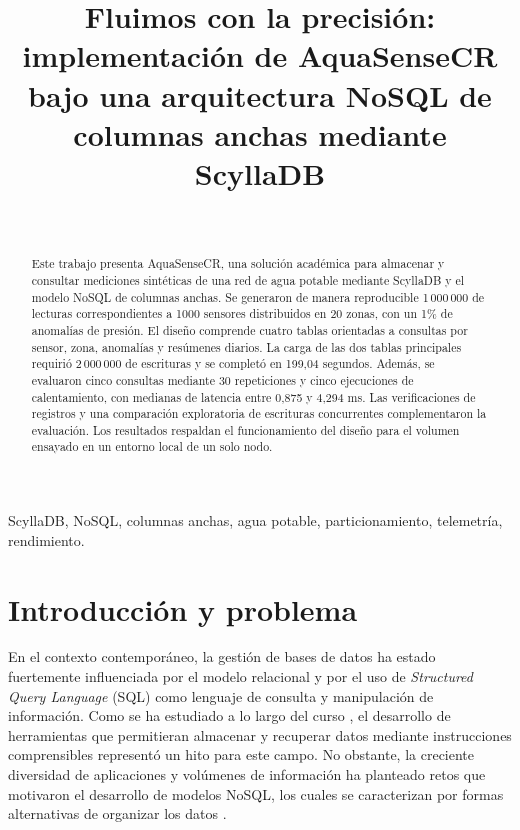 \documentclass[conference]{IEEEtran}
\begin{document}
\title{Fluimos con la precisión: implementación de AquaSenseCR bajo una arquitectura NoSQL de columnas anchas mediante ScyllaDB}

\author{
    \\[3pt]
}

\maketitle

\begin{abstract}
Este trabajo presenta AquaSenseCR, una solución académica para almacenar y consultar mediciones sintéticas de una red de agua potable mediante ScyllaDB y el modelo NoSQL de columnas anchas. Se generaron de manera reproducible 1\,000\,000 de lecturas correspondientes a 1000 sensores distribuidos en 20 zonas, con un 1\% de anomalías de presión. El diseño comprende cuatro tablas orientadas a consultas por sensor, zona, anomalías y resúmenes diarios. La carga de las dos tablas principales requirió 2\,000\,000 de escrituras y se completó en 199,04 segundos. Además, se evaluaron cinco consultas mediante 30 repeticiones y cinco ejecuciones de calentamiento, con medianas de latencia entre 0,875 y 4,294 ms. Las verificaciones de registros y una comparación exploratoria de escrituras concurrentes complementaron la evaluación. Los resultados respaldan el funcionamiento del diseño para el volumen ensayado en un entorno local de un solo nodo.
\end{abstract}

\begin{IEEEkeywords}
ScyllaDB, NoSQL, columnas anchas, agua potable, particionamiento, telemetría, rendimiento.
\end{IEEEkeywords}

\section{Introducción y problema}

En el contexto contemporáneo, la gestión de bases de datos ha estado fuertemente influenciada por el modelo relacional y por el uso de \textit{Structured Query Language} (SQL) como lenguaje de consulta y manipulación de información. Como se ha estudiado a lo largo del curso \cite{wade2012}, el desarrollo de herramientas que permitieran almacenar y recuperar datos mediante instrucciones comprensibles representó un hito para este campo. No obstante, la creciente diversidad de aplicaciones y volúmenes de información ha planteado retos que motivaron el desarrollo de modelos NoSQL, los cuales se caracterizan por formas alternativas de organizar los datos \cite{han2011}.
\end{document}
